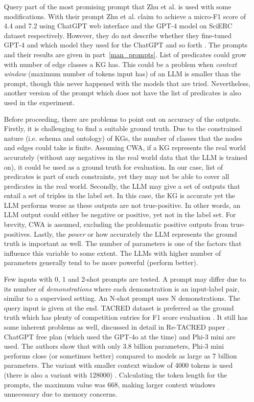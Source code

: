 \documentclass{article}
\begin{document}
Query part of the most promising prompt that Zhu et al. is used with some modifications. With their prompt Zhu et al. claim to achieve a micro-F1 score of 4.4 and 7.2 using ChatGPT web interface and the GPT-4 model on SciERC dataset respectively. However, they do not describe whether they fine-tuned GPT-4 and which model they used for the ChatGPT and so forth \cite{zhu_llms_2024}. The prompts and their results are given in part~\ref{man_prompts}. List of predicates could grow with number of edge classes a KG has. This could be a problem when \textit{context window} (maximum number of tokens input has) of an LLM is smaller than the prompt, though this never happened with the models that are tried. Nevertheless, another version of the prompt which does not have the list of predicates is also used in the experiment. 

Before proceeding, there are problems to point out on accuracy of the outputs. Firstly, it is challenging to find a suitable ground truth. Due to the constrained nature (i.e. schema and ontology) of KGs, the number of classes that the nodes and edges could take is finite. Assuming CWA, if a KG represents the real world accurately (without any negatives in the real world data that the LLM is trained on), it could be used as a ground truth for evaluation. In our case, list of predicates is part of such constraints, yet they may not be able to cover all predicates in the real world. Secondly, the LLM may give a set of outputs that entail a set of triples in the label set. In this case, the KG is accurate yet the LLM performs worse as these outputs are not true-positive. In other words, an LLM output could either be negative or positive, yet not in the label set. For brevity, CWA is assumed, excluding the problematic positive outputs from true-positives. Lastly, the \textit{power} or how accurately the LLM represents the ground truth is important as well. The number of parameters is one of the factors that influence this variable to some extent. The LLMs with higher number of parameters generally tend to be more powerful (perform better). 

Few inputs with 0, 1 and 2-shot prompts are tested. A prompt may differ due to its number of \textit{demonstrations} where each demonstration is an input-label pair, similar to a supervised setting. An N-shot prompt uses N demonstrations. The query input is given at the end. TACRED dataset is preferred as the ground truth which has plenty of competition entries for F1 score evaluation \cite{zhang_position-aware_2017,noauthor_tacred_nodate}. It still has some inherent problems as well, discussed in detail in Re-TACRED paper \cite{stoica_re-tacred_2021}. ChatGPT free plan (which used the GPT-4o at the time) and Phi-3 mini are used. The authors show that with only 3.8 billion parameters, Phi-3 mini performs close (or sometimes better) compared to models as large as 7 billion parameters. The variant with smaller context window of 4000 tokens is used (there is also a variant with 128000) \cite{abdin_phi-3_2024}. Calculating the token length for the prompts, the maximum value was 668, making larger context windows unnecessary due to memory concerns. 
\end{document}
